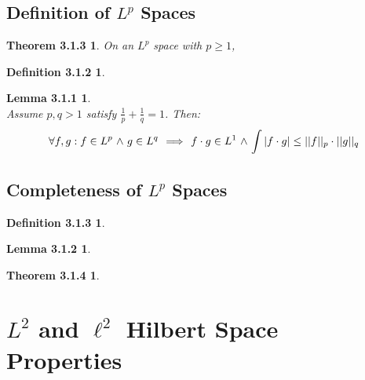\documentclass{article}
\theoremstyle{plain}
\newtheorem*{def313*}{Definition 3.1.3}
\newtheorem*{def312*}{Definition 3.1.2}
\newtheorem*{lemma311*}{Lemma 3.1.1}
\newtheorem*{theorem313*}{Theorem 3.1.3}
\newtheorem*{theorem314*}{Theorem 3.1.4}
\newtheorem*{lemma312*}{Lemma 3.1.2}
\begin{document}
\subsection*{Definition of $L^{p}$ Spaces}

\begin{theorem313*} On an $L^{p}$ space with $ p \geq 1 $,
\end{theorem313*}

\begin{def312*} 
\end{def312*}

\begin{lemma311*}  \\
Assume $ p, q > 1 $ satisfy $ \frac{1}{p} + \frac{1}{q} = 1 $. Then:
$$ \forall f, g : f \in L^{p} \hspace{.1 em} \land \hspace{.1 em} g \in L^{q} \hspace{.125 em} \implies \hspace{.125 em} f \cdot g \in L^{1} \hspace{.1 em} \land \hspace{.1 em} \int | f \cdot g | \leq || f ||_{p} \cdot || g ||_{q}
$$
\end{lemma311*}



\subsection*{Completeness of $ L^{p} $ Spaces}
\begin{def313*} 
\end{def313*}

\begin{lemma312*} \end{lemma312*}


\begin{theorem314*} 
\end{theorem314*}

 

\section*{$L^{2}$ and $\ell^{2} $ Hilbert Space Properties}
\end{document}
